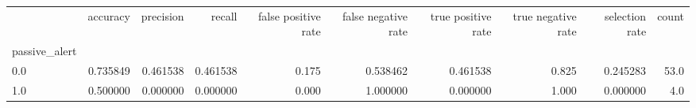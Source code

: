 \begin{tabular}{lrrrrrrrrr}
\toprule
{} &  accuracy &  precision &    recall &  false positive rate &  false negative rate &  true positive rate &  true negative rate &  selection rate &  count \\
passive\_alert &           &            &           &                      &                      &                     &                     &                 &        \\
\midrule
0.0           &  0.735849 &   0.461538 &  0.461538 &                0.175 &             0.538462 &            0.461538 &               0.825 &        0.245283 &   53.0 \\
1.0           &  0.500000 &   0.000000 &  0.000000 &                0.000 &             1.000000 &            0.000000 &               1.000 &        0.000000 &    4.0 \\
\bottomrule
\end{tabular}
